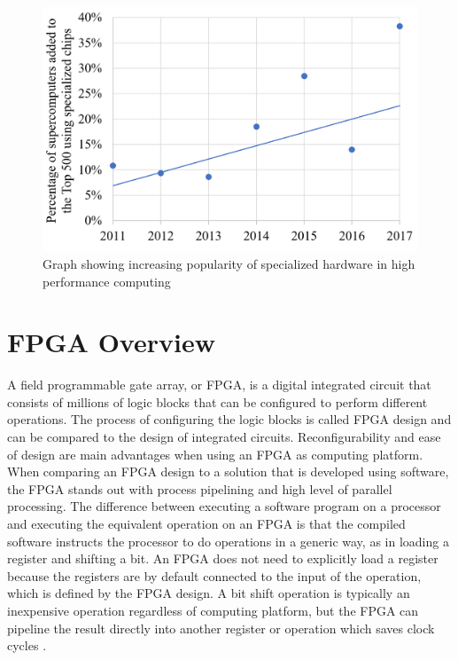 \documentclass[12pt]{report}
\begin{document}
\begin{figure}
    \centering
    \includegraphics[scale=0.4]{figures/Supercomputers-with-pecialized-chips.png}
    \caption{Graph showing increasing popularity of 
specialized hardware in high performance computing \citep{GenPurpTech}}
    \label{fig:1}
\end{figure}

\section{FPGA Overview}
A field programmable gate array, or FPGA, is a digital integrated circuit that consists of millions of logic blocks that can be configured to perform different operations. The process of configuring the logic blocks is called FPGA design and can be compared to the design of integrated circuits. Reconfigurability and ease of design are main advantages when using an FPGA as computing platform. When comparing an FPGA design to a solution that is developed using software, the FPGA stands out with process pipelining and high level of parallel processing. The difference between executing a software program on a processor and executing the equivalent operation on an FPGA is that the compiled software instructs the processor to do operations in a generic way, as in loading a register and shifting a bit. An FPGA does not need to explicitly load a register because the registers are by default connected to the input of the operation, which is defined by the FPGA design. A bit shift operation is typically an inexpensive operation regardless of computing platform, but the FPGA can pipeline the result directly into another register or operation which saves clock cycles \citep{XilFPGAIntro}.
  
\end{document}
